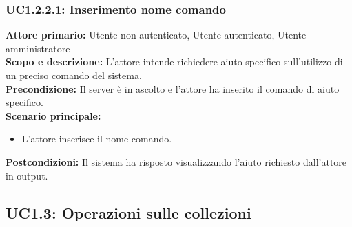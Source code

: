 \documentclass{scalatekids-article}
\begin{document}
\subsubsection{UC1.2.2.1: Inserimento nome comando}

\textbf{Attore primario:} Utente non autenticato, Utente autenticato, Utente amministratore\\
\textbf{Scopo e descrizione:} L'attore intende richiedere aiuto specifico sull'utilizzo di un preciso comando del sistema.\\
\textbf{Precondizione:} Il server è in ascolto e l'attore ha inserito il comando di aiuto specifico.\\
\textbf{Scenario principale:}
\begin{itemize}
\item L'attore inserisce il nome comando.
\end{itemize}
\textbf{Postcondizioni:} Il sistema ha risposto visualizzando l'aiuto richiesto dall'attore in output.

\subsection{UC1.3: Operazioni sulle collezioni}
\end{document}
